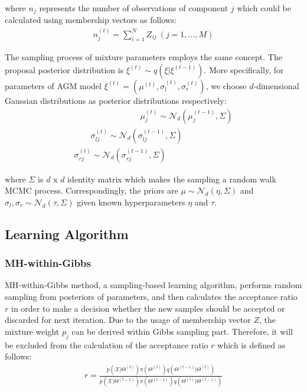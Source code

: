 \documentclass[conference]{IEEEtran}
\begin{document}
where $n_j$ represents the number of observations of component $j$ which could be calculated using membership vectors as follows:
\begin{align}
n_j^{(t)} = \sum_{i=1}^NZ_{ij}\ (j = 1,...,M) 
\label{eq:nj}
\end{align}

The sampling process of mixture parameters employs the same concept. The proposal posterior distribution is  $\xi^{(t)} \sim q(\xi|\xi^{(t-1)})$. More specifically, for parameters of AGM model $\xi^{(t)} = (\mu^{(t)}, \sigma_{l}^{(t)}, \sigma_{r}^{(t)})$, we choose $d$-dimensional Gaussian distributions as posterior distributions respectively:
\begin{multline}
\qquad\qquad\qquad\qquad\mu_j^{(t)} \sim \mathcal{N}_d(\mu_j^{(t-1)},\Sigma) \\
\qquad\sigma_{lj}^{(t)} \sim \mathcal{N}_d(\sigma_{lj}^{(t-1)},\Sigma) \\
\sigma_{rj}^{(t)} \sim \mathcal{N}_d(\sigma_{rj}^{(t-1)},\Sigma)\qquad\qquad\quad
\label{eq:posters}
\end{multline}

where $\Sigma$ is $d$ x $d$ identity matrix which makes the sampling a random walk MCMC process. Correspondingly, the priors are $\mu \sim \mathcal{N}_d(\eta,\Sigma)$ and $\sigma_l, \sigma_r \sim \mathcal{N}_d(\tau,\Sigma)$ given known hyperparameters $\eta$ and $\tau$.


\subsection{Learning Algorithm}
\subsubsection*{MH-within-Gibbs}
MH-within-Gibbs method, a sampling-based learning algorithm,  performs random sampling from posteriors of parameters, and then calculates the acceptance ratio $r$ in order to make a decision whether the new samples should be accepted or discarded for next iteration. Due to the usage of membership vector $Z$, the mixture weight $p_j$ can be derived within Gibbs sampling part. Therefore, it will be excluded from the calculation of the acceptance ratio $r$ which is defined as follows:
\begin{align}
r = \frac{p(\mathcal{X}|\Theta^{(t)})\pi(\Theta^{(t)})q(\Theta^{(t-1)}|\Theta^{(t)})}{p(\mathcal{X}|\Theta^{(t-1)})\pi(\Theta^{(t-1)})q(\Theta^{(t)}|\Theta^{(t-1)})}
\label{eq:r}
\end{align}
\end{document}
